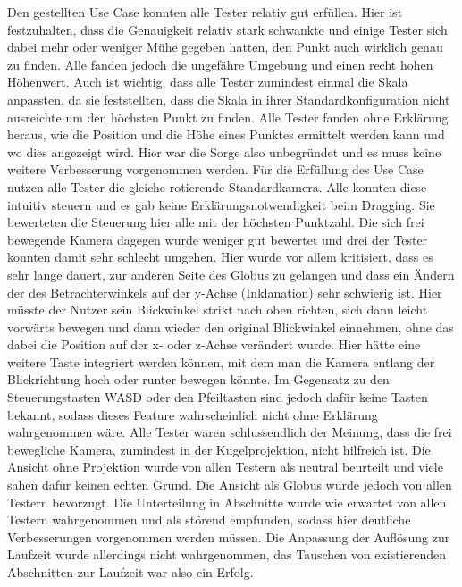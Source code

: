Den gestellten Use Case konnten alle Tester relativ gut erfüllen. Hier ist festzuhalten, dass die Genauigkeit relativ stark schwankte und einige Tester sich dabei mehr oder weniger Mühe gegeben hatten, den Punkt auch wirklich genau zu finden. Alle fanden jedoch die ungefähre Umgebung und einen recht hohen Höhenwert. Auch ist wichtig, dass alle Tester zumindest einmal die Skala anpassten, da sie feststellten, dass die Skala in ihrer Standardkonfiguration nicht ausreichte um den höchsten Punkt zu finden. Alle Tester fanden ohne Erklärung heraus, wie die Position und die Höhe eines Punktes ermittelt werden kann und wo dies angezeigt wird. Hier war die Sorge also unbegründet und es muss keine weitere Verbesserung vorgenommen werden. Für die Erfüllung des Use Case nutzen alle Tester die gleiche rotierende Standardkamera. Alle konnten diese intuitiv steuern und es gab keine Erklärungsnotwendigkeit beim Dragging. Sie bewerteten die Steuerung hier alle mit der höchsten Punktzahl. Die sich frei bewegende Kamera dagegen wurde weniger gut bewertet und drei der Tester konnten damit sehr schlecht umgehen. Hier wurde vor allem kritisiert, dass es sehr lange dauert, zur anderen Seite des Globus zu gelangen und dass ein Ändern der des Betrachterwinkels auf der y-Achse (Inklanation) sehr schwierig ist. Hier müsste der Nutzer sein Blickwinkel strikt nach oben richten, sich dann leicht vorwärts bewegen und dann wieder den original Blickwinkel einnehmen, ohne das dabei die Position auf der x- oder z-Achse verändert wurde. Hier hätte eine weitere Taste integriert werden können, mit dem man die Kamera entlang der Blickrichtung hoch oder runter bewegen könnte. Im Gegensatz zu den Steuerungstasten WASD oder den Pfeiltasten sind jedoch dafür keine Tasten bekannt, sodass dieses Feature wahrscheinlich nicht ohne Erklärung wahrgenommen wäre. Alle Tester waren schlussendlich der Meinung, dass die frei bewegliche Kamera, zumindest in der Kugelprojektion, nicht hilfreich ist. Die Ansicht ohne Projektion wurde von allen Testern als neutral beurteilt und viele sahen dafür keinen echten Grund. Die Ansicht als Globus wurde jedoch von allen Testern bevorzugt. Die Unterteilung in Abschnitte wurde wie erwartet von allen Testern wahrgenommen und als störend empfunden, sodass hier deutliche Verbesserungen vorgenommen werden müssen. Die Anpassung der Auflösung zur Laufzeit wurde allerdings nicht wahrgenommen, das Tauschen von existierenden Abschnitten zur Laufzeit war also ein Erfolg.

